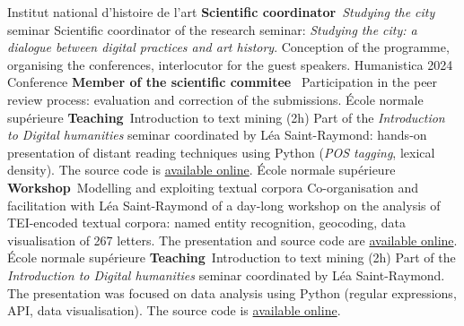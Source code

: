 	{%
		Institut national d'histoire de l'art}
	{%
		\textbf{Scientific coordinator}~\textit{Studying the city} seminar}
	{%
		Scientific coordinator of the research seminar: \textit{Studying the city: a dialogue between digital practices and art history}. Conception of the programme, organising the conferences, interlocutor for the guest speakers.}
	{%
		Humanistica 2024 Conference}
	{%
		\textbf{Member of the scientific commitee}~}
	{%
		Participation in the peer review process: evaluation and correction of the submissions.}
	{%
		École normale supérieure}
	{%
		\textbf{Teaching}~Introduction to text mining (2h)}
	{%
		Part of the \textit{Introduction to Digital humanities} seminar coordinated by Léa Saint-Raymond: hands-on presentation of distant reading techniques using Python (\textit{POS tagging}, lexical density). The source code is \href{https://github.com/paulhectork/cours_ens2024_fouille_de_texte.git}{available online}.}
	{%
		École normale supérieure}
	{%
		\textbf{Workshop}~Modelling and exploiting textual corpora}
	{%
		Co-organisation and facilitation with Léa Saint-Raymond of a day-long workshop on the analysis of TEI-encoded textual corpora: named entity recognition, geocoding, data visualisation of 267 letters. The presentation and source code are \href{https://github.com/paulhectork/cours_ens2023_xmltei}{available online}.}
	{%
		École normale supérieure}
	{%
		\textbf{Teaching}~Introduction to text mining (2h)}
	{%
		Part of the \textit{Introduction to Digital humanities} seminar coordinated by Léa Saint-Raymond. The presentation was focused on data analysis using Python (regular expressions, API, data visualisation). The source code is \href{https://github.com/paulhectork/cours_ens2024_fouille_de_texte.git}{available online}.}


